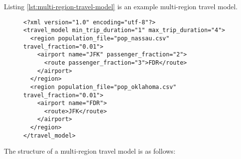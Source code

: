 Listing \ref{lst:multi-region-travel-model} is an example multi-region travel model.

\begin{figure}[h]
	\begin{lstlisting}
<?xml version="1.0" encoding="utf-8"?>
<travel_model min_trip_duration="1" max_trip_duration="4">
  <region population_file="pop_nassau.csv" travel_fraction="0.01">
    <airport name="JFK" passenger_fraction="2">
      <route passenger_fraction="3">FDR</route>
    </airport>
  </region>
  <region population_file="pop_oklahoma.csv" travel_fraction="0.01">
    <airport name="FDR">
      <route>JFK</route>
    </airport>
  </region>
</travel_model>
	\end{lstlisting}
\end{figure}

The structure of a multi-region travel model is as follows:

